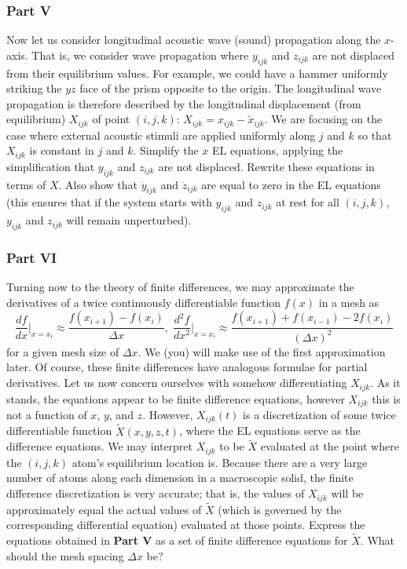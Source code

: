 \documentclass[letterpaper,12pt]{article}
\newcommand*{\deriv}[2]{\frac{d #1}{d #2}}
\newcommand*{\nderiv}[3]{\frac{d^{#3} #1}{d #2^{#3}}}
\begin{document}
\begin{flushleft}
    \subsubsection*{Part V}
    Now let us consider longitudinal acoustic wave (sound) propagation along the $x$-axis. That is, we consider wave propagation where $y_{ijk}$ and $z_{ijk}$ are not displaced from their equilibrium values. For example, we could have a hammer uniformly striking the $yz$ face of the prism opposite to the origin. The longitudinal wave propagation is therefore described by the longitudinal displacement (from equilibrium) $X_{ijk}$ of point $(i, j, k)$: $X_{ijk} = x_{ijk} - \tilde{x}_{ijk}$. We are focusing on the case where external acoustic stimuli are applied uniformly along $j$ and $k$ so that $X_{ijk}$ is constant in $j$ and $k$.\newline\newline
    Simplify the $x$ EL equations, applying the simplification that $y_{ijk}$ and $z_{ijk}$ are not displaced. Rewrite these equations in terms of $X$. Also show that $\ddot{y}_{ijk}$ and $\ddot{z}_{ijk}$ are equal to zero in the EL equations (this ensures that if the system starts with $y_{ijk}$ and $z_{ijk}$ at rest for all $(i, j, k)$, $y_{ijk}$ and $z_{ijk}$ will remain unperturbed).

    \subsubsection*{Part VI}
    Turning now to the theory of finite differences, we may approximate the derivatives of a twice continuously differentiable function $f(x)$ in a mesh as
    $$\deriv{f}{x}\bigg|_{x=x_i} \approx \frac{f(x_{i+1}) - f(x_i)}{\Delta x}, \; \nderiv{f}{x}{2}\bigg|_{x=x_i} \approx \frac{f(x_{i+1}) + f(x_{i-1}) - 2f(x_i)}{\left(\Delta x\right)^2}$$
    for a given mesh size of $\Delta x$. We (you) will make use of the first approximation later. Of course, these finite differences have analogous formulae for partial derivatives.\newline\newline
    Let us now concern ourselves with somehow differentiating $X_{ijk}$. As it stands, the equations appear to be finite difference equations, however $X_{ijk}$ this is not a function of $x$, $y$, and $z$. However, $X_{ijk}(t)$ is a discretization of some twice differentiable function $\tilde{X}(x, y, z, t)$, where the EL equations serve as the difference equations. We may interpret $X_{ijk}$ to be $\tilde{X}$ evaluated at the point where the $(i, j, k)$ atom's equilibrium location is. Because there are a very large number of atoms along each dimension in a macroscopic solid, the finite difference discretization is very accurate; that is, the values of $X_{ijk}$ will be approximately equal the actual values of $\tilde{X}$ (which is governed by the corresponding differential equation) evaluated at those points.\newline\newline
    Express the equations obtained in \textbf{Part V} as a set of finite difference equations for $\tilde{X}$. What should the mesh spacing $\Delta x$ be?


\end{flushleft}
\end{document}
